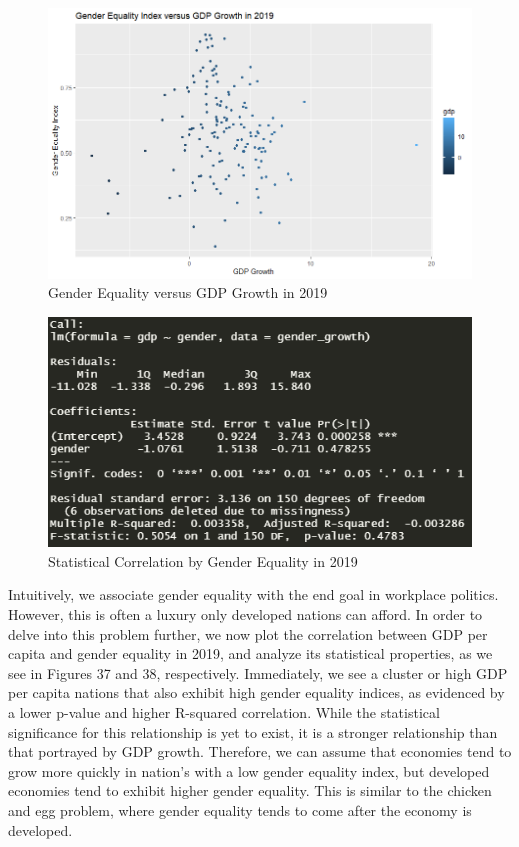 \documentclass[15pt]{article}
\begin{document}
\begin{figure}[H]
    \centering
    \includegraphics[scale = 0.5]{Part7_gender_growth.png}
    \caption{Gender Equality versus GDP Growth in 2019}
\end{figure}

\begin{figure}[H]
    \centering
    \includegraphics[scale = 0.7]{Part7_gender_growth_r^2.PNG}
    \caption{Statistical Correlation by Gender Equality in 2019}
\end{figure}

\noindent Intuitively, we associate gender equality with the end goal in workplace politics. However, this is often a luxury only developed nations can afford. In order to delve into this problem further, we now plot the correlation between GDP per capita and gender equality in 2019, and analyze its statistical properties, as we see in Figures 37 and 38, respectively. Immediately, we see a cluster or high GDP per capita nations that also exhibit high gender equality indices, as evidenced by a lower p-value and higher R-squared correlation. While the statistical significance for this relationship is yet to exist, it is a stronger relationship than that portrayed by GDP growth. Therefore, we can assume that economies tend to grow more quickly in nation's with a low gender equality index, but developed economies tend to exhibit higher gender equality. This is similar to the chicken and egg problem, where gender equality tends to come after the economy is developed.
\end{document}
